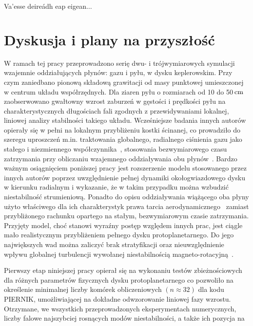 \begin{savequote}[75mm]
   Va'esse deireádh eap eigean$\ldots$
\end{savequote}

\chapter{Dyskusja i plany na przyszłość}
W ramach tej pracy przeprowadzono serię dwu- i trójwymiarowych symulacji
wzajemnie oddziałujących płynów: gazu i pyłu, w dysku keplerowskim. Przy czym
zaniedbano pionową składową grawitacji od masy punktowej umieszczonej w centrum
układu współrzędnych. Dla ziaren pyłu o rozmiarach od 10 do 50$\hbox{$\thinspace\textrm{cm}$}$
zaobserwowano gwałtowny wzrost zaburzeń w gęstości i prędkości pyłu na
charakterystycznych długościach fali zgodnych z przewidywaniami lokalnej,
liniowej analizy stabilności takiego układu. Wcześniejsze badania innych
autorów~\cite{YG05, JY07, TB09, BS10a, BS10b} opierały się w pełni na lokalnym
przybliżeniu kostki ścinanej, co prowadziło do szeregu uproszczeń m.in.
traktowania globalnego, radialnego ciśnienia gazu jako stałego i niezmiennego
współczynnika~\cite{N86}, stosowania bezwymiarowego czasu zatrzymania przy
obliczaniu wzajemnego oddziaływania obu płynów~\cite{YG05}. Bardzo ważnym
osiągnięciem poniższej pracy jest rozszerzenie modelu stosowanego przez innych
autorów poprzez uwzględnienie pełnej dynamiki okołogwiazdowego dysku w kierunku
radialnym i wykazanie, że w takim przypadku można wzbudzić niestabilność
strumieniową. Ponadto do opisu oddziaływania wiążącego oba płyny użyto
właściwego dla ich charakterystyk prawa tarcia aerodynamicznego~
zamiast przybliżonego rachunku opartego na stałym, bezwymiarowym czasie
zatrzymania. Przyjęty model, choć stanowi wyraźny postęp względem innych prac, jest
ciągle mało realistycznym przybliżeniem pełnego dysku protoplanetarnego. Do jego
największych wad można zaliczyć brak stratyfikacji oraz nieuwzględnienie wpływu
globalnej turbulencji wywołanej niestabilnością magneto-rotacyjną~\cite{DKJ14}. 
%
\par Pierwszy etap niniejszej pracy opierał się na wykonaniu testów
zbieżnościowych dla różnych parametrów fizycznych dysku protoplanetarnego co
pozwoliło na określenie minimalnej liczby komórek obliczeniowych $(n\approx32)$
dla kodu \textsc{PIERNIK}, umożliwiającej na dokładne odwzorowanie liniowej fazy
wzrostu.  Otrzymane, we wszystkich przeprowadzonych eksperymentach numerycznych,
liczby falowe najszybciej rosnących modów niestabilności, a także ich pozycja na
